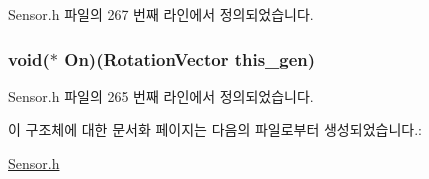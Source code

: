 Sensor.\-h 파일의 267 번째 라인에서 정의되었습니다.

\hypertarget{struct___rotation_vector_a4b696cbf05ce516ce608cb1ac70dbcc3}{
\subsubsection[{On}]{\setlength{\rightskip}{0pt plus 5cm}void($\ast$  On)({\bf Rotation\-Vector} this\-\_\-gen)}}\label{struct___rotation_vector_a4b696cbf05ce516ce608cb1ac70dbcc3}


Sensor.\-h 파일의 265 번째 라인에서 정의되었습니다.



이 구조체에 대한 문서화 페이지는 다음의 파일로부터 생성되었습니다.\-:\begin{DoxyCompactItemize}
\item 
\hyperlink{_sensor_8h}{Sensor.\-h}\end{DoxyCompactItemize}

